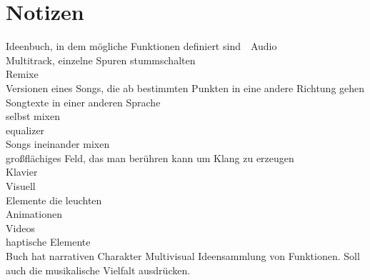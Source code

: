 




\chapter{Notizen}\label{einleitung}

Ideenbuch, in dem mögliche Funktionen definiert sind
 
Audio\\
Multitrack, einzelne Spuren stummschalten\\
Remixe\\
Versionen eines Songs, die ab bestimmten Punkten in eine andere Richtung gehen\\
Songtexte in einer anderen Sprache\\
selbst mixen\\
equalizer\\
Songs ineinander mixen\\
großflächiges Feld, das man berühren kann um Klang zu erzeugen\\
Klavier\\

Visuell\\
Elemente die leuchten\\
Animationen\\
Videos\\

haptische Elemente\\

Buch hat narrativen Charakter
Multivisual
Ideensammlung von Funktionen. Soll auch die musikalische Vielfalt ausdrücken.






 







